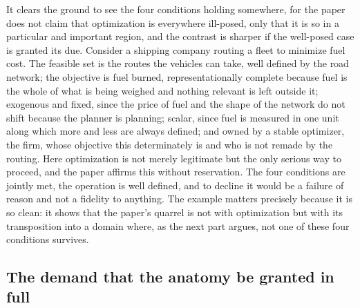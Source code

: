 It clears the ground to see the four conditions holding somewhere, for the paper does not claim that optimization is everywhere ill-posed, only that it is so in a particular and important region, and the contrast is sharper if the well-posed case is granted its due. Consider a shipping company routing a fleet to minimize fuel cost. The feasible set is the routes the vehicles can take, well defined by the road network; the objective is fuel burned, representationally complete because fuel is the whole of what is being weighed and nothing relevant is left outside it; exogenous and fixed, since the price of fuel and the shape of the network do not shift because the planner is planning; scalar, since fuel is measured in one unit along which more and less are always defined; and owned by a stable optimizer, the firm, whose objective this determinately is and who is not remade by the routing. Here optimization is not merely legitimate but the only serious way to proceed, and the paper affirms this without reservation. The four conditions are jointly met, the operation is well defined, and to decline it would be a failure of reason and not a fidelity to anything. The example matters precisely because it is so clean: it shows that the paper's quarrel is not with optimization but with its transposition into a domain where, as the next part argues, not one of these four conditions survives.

\subsection*{The demand that the anatomy be granted in full}

